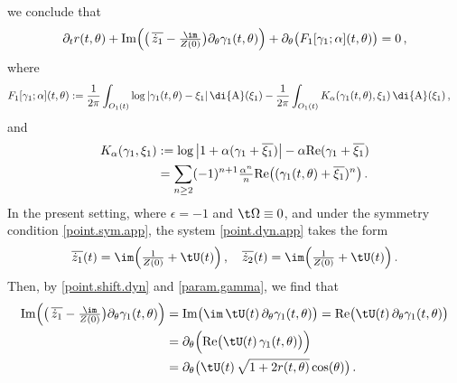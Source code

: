 \documentclass[a4paper,reqno,10pt]{article}
\newcommand{\pa}{\partial}
\newcommand{\wrta}{\,\di {\rm A}}
\begin{document}
we conclude that
\begin{equation}\label{quasi.final.eq}
	\pa_{t} r(t,\theta)  + {\rm Im} \Big(\big(\,  \overline{\dot{z}_1} -\tfrac{\im}{Z(0)} \big) \pa_{\theta}\gamma_{1}(t,\theta) \Big) + \pa_{\theta} \big( F_1[\gamma_{1};\alpha](t,\theta) \big) = 0 \,,
\end{equation}
where
\begin{equation}\label{F1}
	\begin{aligned}
		F_1[\gamma_{1};\alpha](t,\theta)  & :=  \frac{1}{2\pi} \int_{O_{1}(t)} \log |  \gamma_{1}(t,\theta) -\xi_{1} | \wrta(\xi_{1})  - \frac{1}{2\pi} \int_{O_{1}(t)} K_{\alpha}(\gamma_{1}(t,\theta),\xi_{1}) \wrta(\xi_{1})\,,
	\end{aligned}
\end{equation}
and
\begin{equation}\label{Kalpha.kernel}
\begin{aligned}
		K_\alpha(\gamma_{1},\xi_{1}) & := \log \big| 1+\alpha( \gamma_{1}+ \overline{\xi_{1}} )\big| - \alpha {\rm Re}(\gamma_{1}+\overline{\xi_{1}})\\
		& = \sum_{n\geq 2}(-1)^{n+1} \tfrac{\alpha^{n}}{n}{\rm Re}\big(( \gamma_{1}(t,\theta)+\overline{\xi_{1}} )^n\big) \,.
\end{aligned}
\end{equation}
In the present setting, where $\epsilon=-1$ and $\t\Omega\equiv0$, and under the symmetry condition \eqref{point.sym.app}, the system \eqref{point.dyn.app} takes the form
\begin{equation}\label{point.shift.dyn}
	 \overline{\dot{z}_1}(t) = \im \Big( \tfrac{1}{Z(0)} + \tU(t)  \Big) \,, \quad  \overline{\dot{z}_2}(t) = \im \Big( \tfrac{1}{Z(0)} + \tU(t)  \Big) \,.
\end{equation}
Then, by \eqref{point.shift.dyn} and \eqref{param.gamma}, we find that
\begin{equation}\label{ImReU}
	\begin{aligned}
		 {\rm Im} \Big( \big( \,\overline{\dot{z}_1} -\tfrac{\im}{Z(0)} \big) \pa_{\theta}\gamma_{1}(t,\theta) \Big) & =  {\rm Im} \big(\im\, \tU(t)\, \pa_{\theta}\gamma_{1}(t,\theta) \big) =  {\rm Re} \big( \tU(t)\, \pa_{\theta}\gamma_{1}(t,\theta) \big) \\
		 &  =\pa_{\theta}\Big( {\rm Re} \big( \tU(t)\, \gamma_{1}(t,\theta) \big)\Big) \\
		 &= \pa_{\theta}\big( \tU(t) \, \sqrt{1+2r(t,\theta)} \cos(\theta) \big)\,.
	\end{aligned}
\end{equation}
\end{document}
